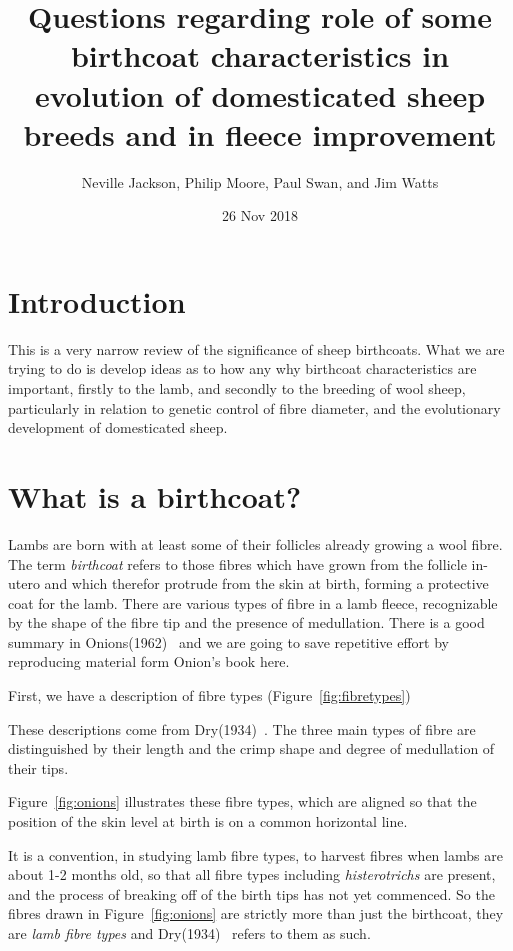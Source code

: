 \documentclass[titlepage]{article}  %
\title{Questions regarding role of some birthcoat characteristics in evolution of domesticated sheep breeds and in fleece improvement}
\author{Neville Jackson, Philip  Moore, Paul Swan, and Jim Watts}
\date{26 Nov 2018}
\begin{document}
 
 
\maketitle      
\tableofcontents

\clearpage
\section{Introduction} 
This is a  very narrow review of the significance of sheep birthcoats. What we are trying to do is  develop ideas as to how any why birthcoat characteristics are important,  firstly to the lamb, and secondly to the breeding of wool sheep, particularly  in relation to genetic control of fibre diameter, and the evolutionary development of domesticated sheep.


\section{What is a birthcoat?}
Lambs are born with at least some of their follicles already growing a wool fibre. The term {\em birthcoat} refers to those fibres which have grown from the follicle in-utero and which therefor protrude from the skin at birth, forming a protective coat for the lamb. There are various types of fibre in a lamb fleece, recognizable by the shape of the fibre tip and the presence of medullation. There is a good summary in Onions(1962)~\cite{onio:62} and we are going to save repetitive effort by reproducing material form Onion's book here.

First, we have a description of fibre types (Figure~\ref{fig:fibretypes})

These descriptions come from Dry(1934)~\cite{dryf:34}. The three main types of fibre are distinguished by their length and the crimp shape and degree of medullation of their tips.

Figure~\ref{fig:onions} illustrates these fibre types, which are aligned so that the position of the skin level at birth is on a common horizontal line.

It is a convention, in studying lamb fibre types, to harvest fibres when lambs are about 1-2 months old, so that all fibre types including {\em histerotrichs} are present, and the process of breaking off of the birth tips has not yet commenced. So the fibres drawn in Figure~\ref{fig:onions} are strictly more than just the birthcoat, they are {\em lamb fibre types} and Dry(1934)~\cite{dryf:34} refers to them as such.
\end{document}
